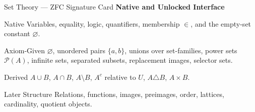 \begin{lrachaptercard}{Set Theory --- ZFC Signature Card}
\medskip
\noindent\textbf{Native and Unlocked Interface}
\begin{lratoolbelt}
\begin{lratoolnative}{Native}
\footnotesize
Variables, equality, logic, quantifiers, membership \(\in\), and the
empty-set constant \(\varnothing\).
\end{lratoolnative}
\begin{lratoolaxiom}{Axiom-Given}
\footnotesize
\(\varnothing\), unordered pairs \(\{a,b\}\), unions over set-families,
power sets \(\mathcal P(A)\), infinite sets, separated subsets, replacement
images, selector sets.
\end{lratoolaxiom}
\begin{lratoolderived}{Derived}
\footnotesize
\(A\cup B\), \(A\cap B\), \(A\setminus B\), \(A^c\) relative to \(U\),
\(A\triangle B\), \(A\times B\).
\end{lratoolderived}
\begin{lratoollater}{Later Structure}
\footnotesize
Relations, functions, images, preimages, order, lattices, cardinality,
quotient objects.
\end{lratoollater}
\end{lratoolbelt}
\end{lrachaptercard}
